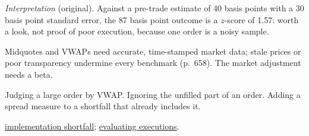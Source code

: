 \begin{qfmethod}
\emph{Interpretation} (original). Against a pre-trade estimate of 40 basis points with a 30 basis point standard error, the 87 basis point outcome is a $z$-score of 1.57: worth a look, not proof of poor execution, because one order is a noisy sample.

 Midquotes and VWAPs need accurate, time-stamped market data; stale prices or poor transparency undermine every benchmark (p.~658). The market adjustment needs a beta.

 Judging a large order by VWAP. Ignoring the unfilled part of an order. Adding a spread measure to a shortfall that already includes it.

 \hyperref[def:implementation-shortfall]{implementation shortfall}; \hyperref[meth:trade-execution-evaluation-governance]{evaluating executions}.

\end{qfmethod}

